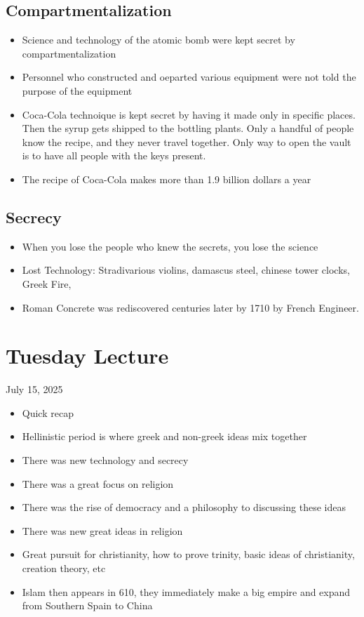 \documentclass{article}
\begin{document}
\subsection{Compartmentalization}
\begin{itemize}
  \item Science and technology of the atomic bomb were kept secret
    by compartmentalization
  \item Personnel who constructed and oeparted various equipment
    were not told the purpose of the equipment
  \item Coca-Cola technoique is kept secret by having it made only in specific places.
    Then the syrup gets shipped to the bottling plants.
    Only a handful of people know the recipe, and they never travel together.
    Only way to open the vault is to have all people with the keys present.
  \item The recipe of Coca-Cola makes more than 1.9 billion dollars a year
\end{itemize}

\subsection{Secrecy}
\begin{itemize}
  \item When you lose the people who knew the secrets,
    you lose the science
  \item Lost Technology: Stradivarious violins, damascus steel, chinese tower clocks, Greek Fire,
  \item Roman Concrete was rediscovered centuries later by 1710 by French Engineer.
\end{itemize}

\section*{Tuesday Lecture}
July 15, 2025
\begin{itemize}
  \item Quick recap
  \item Hellinistic period is where greek and non-greek ideas mix together
  \item There was new technology and secrecy
  \item There was a great focus on religion
  \item There was the rise of democracy and a philosophy to discussing these ideas
  \item There was new great ideas in religion
  \item Great pursuit for christianity, how to prove trinity,
    basic ideas of christianity, creation theory, etc
  \item Islam then appears in 610,
    they immediately make a big empire and expand from Southern Spain
    to China
\end{itemize}
\end{document}
